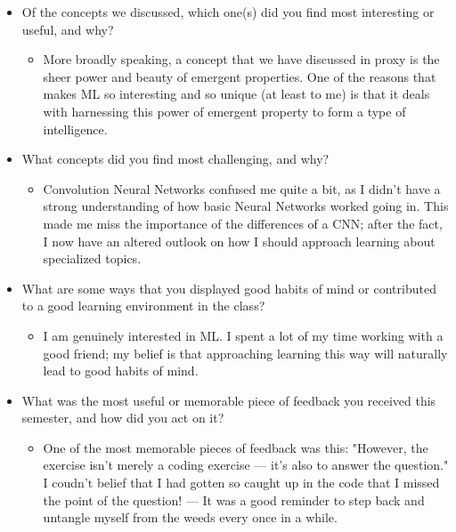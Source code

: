 \documentclass[letterpaper]{article}
\begin{document}
\begin{itemize}
\item Of the concepts we discussed, which one(s) did you find most
interesting or useful, and why?

\begin{itemize}
\item More broadly speaking, a concept that we have discussed in proxy is
the sheer power and beauty of emergent properties. One of the
reasons that makes ML so interesting and so unique (at least to me)
is that it deals with harnessing this power of emergent property to
form a type of intelligence.
\end{itemize}

\item What concepts did you find most challenging, and why?

\begin{itemize}
\item Convolution Neural Networks confused me quite a bit, as I didn't
have a strong understanding of how basic Neural Networks worked
going in. This made me miss the importance of the differences of a
CNN; after the fact, I now have an altered outlook on how I should
approach learning about specialized topics.
\end{itemize}

\item What are some ways that you displayed good habits of mind or
contributed to a good learning environment in the class?

\begin{itemize}
\item I am genuinely interested in ML. I spent a lot of my time working
with a good friend; my belief is that approaching learning this way
will naturally lead to good habits of mind.
\end{itemize}

\item What was the most useful or memorable piece of feedback you received
this semester, and how did you act on it?

\begin{itemize}
\item One of the most memorable pieces of feedback was this: "However, the
exercise isn't merely a coding exercise --- it's also to answer the
question." I coudn't belief that I had gotten so caught up in the
code that I missed the point of the question! --- It was a good
reminder to step back and untangle myself from the weeds every once
in a while.
\end{itemize}
\end{itemize}
\end{document}
